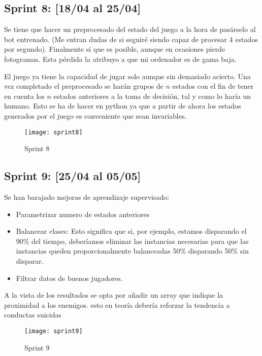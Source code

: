 \subsection{Sprint 8: [18/04 al 25/04]}

Se tiene que hacer un preprocesado del estado del juego a la hora de pasárselo al bot entrenado. (Me entran dudas de si seguiré siendo capaz de procesar 4 estados por segundo). Finalmente si que es posible, aunque en ocasiones pierde fotogramas. Esta pérdida la atribuyo a que mi ordenador es de gama baja.

El juego ya tiene la capacidad de jugar solo aunque sin demasiado acierto. Una vez completado el preprocesado se harán grupos de $n$ estados con el fin de tener en cuenta los $n$ estados anteriores a la toma de decisión, tal y como lo haría un humano. Esto se ha de hacer en python ya que a partir de ahora los estados generados por el juego es conveniente que sean invariables.

\begin{figure}[h!]
    \centering
    \texttt{[image: sprint8]}
    \caption{Sprint 8}
    \label{fig:s8}
\end{figure}

\subsection{Sprint 9: [25/04 al 05/05]}

Se han barajado mejoras de aprendizaje supervisado: 
\begin{itemize}
    \item Parametrizar numero de estados anteriores
    \item Balancear clases: Esto significa que si, por ejemplo, estamos disparando el 90\% del tiempo, deberíamos eliminar las instancias necesarias para que las instancias queden proporcionalmente balanceadas 50\% disparando 50\% sin disparar. 
    \item Filtrar datos de buenos jugadores.
\end{itemize}
  
  A la vista de los resultados se opta por añadir un array que indique la proximidad a los enemigos. esto en teoría debería reforzar la tendencia a conductas suicidas
  

\begin{figure}[h!]
    \centering
    \texttt{[image: sprint9]}
    \caption{Sprint 9}
    \label{fig:s9}
\end{figure}

